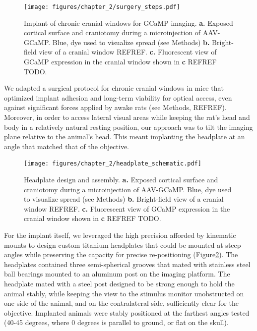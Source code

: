 \begin{figure}
    \texttt{[image: figures/chapter\_2/surgery\_steps.pdf]}
    \vspace{.1in}
    \caption[Chronic cranial window]{Implant of chronic cranial windows for GCaMP imaging. \textbf{a.} Exposed cortical surface and craniotomy during a microinjection of AAV-GCaMP. Blue, dye used to visualize spread (see Methods) \textbf{b.} Bright-field view of a cranial window REFREF. \textbf{c.} Fluorescent view of GCaMP expression in the cranial window shown in \textbf{c} REFREF TODO.
    \label{fig:surgery_steps}}
\end{figure}

We adapted a surgical protocol for chronic cranial windows in mice \cite{Goldey2014} that optimized implant adhesion and long-term viability for optical access, even against significant forces applied by awake rats (see Methods, REFREF). Moreover, in order to access  lateral visual areas while keeping the rat’s head and body in a relatively natural resting position, our approach was to tilt the imaging plane relative to the animal’s head. This meant implanting the headplate at an angle that matched that of the objective. 

\begin{figure}
    \texttt{[image: figures/chapter\_2/headplate\_schematic.pdf]}
    \vspace{.1in}
    \caption[Headplate design and assembly]{Headplate design and assembly. \textbf{a.} Exposed cortical surface and craniotomy during a microinjection of AAV-GCaMP. Blue, dye used to visualize spread (see Methods) \textbf{b.} Bright-field view of a cranial window REFREF. \textbf{c.} Fluorescent view of GCaMP expression in the cranial window shown in \textbf{c} REFREF TODO.
    \label{fig:headplate_schematic}}
\end{figure}

For the implant itself, we leveraged the high precision afforded by kinematic mounts to design custom titanium headplates that could be mounted at steep angles while preserving the capacity for precise re-positioning (Figure\ref{fig:headplate_schematic}). The headplates contained three semi-spherical grooves that mated with stainless steel ball bearings mounted to an aluminum post on the imaging platform. The headplate mated with a steel post designed to be strong enough to hold the animal stably, while keeping the view to the stimulus monitor unobstructed on one side of the animal, and on the contralateral side, sufficiently clear for the objective. Implanted animals were stably positioned at the farthest angles tested (40-45 degrees, where 0 degrees is parallel to ground, or flat on the skull).  

